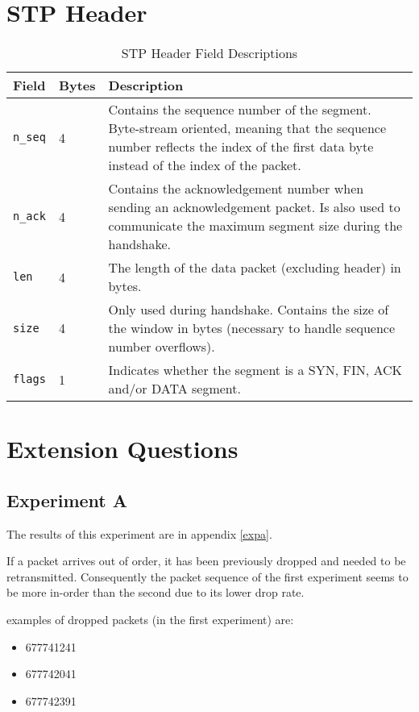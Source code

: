 \documentclass[a4paper]{article}
\begin{document}
\section{STP Header}

\begin{table}[H]
\centering
\caption{STP Header Field Descriptions}
\label{header}
\begin{tabular}{@{}llp{}@{}}
\toprule
Field & Bytes & Description \\ \midrule
\verb|n_seq| & 4 & Contains the sequence number  of the segment. Byte-stream oriented, meaning that the sequence number reflects the index of the first data byte instead of the index of the packet. \\
\verb|n_ack| & 4 & Contains the acknowledgement number when sending an acknowledgement packet. Is also used to communicate the maximum segment size during the handshake. \\
\verb|len| & 4 & The length of the data packet (excluding header) in bytes. \\
\verb|size| & 4 & Only used during handshake. Contains the size of the window in bytes (necessary to handle sequence number overflows). \\
\verb|flags| & 1 & Indicates whether the segment is a SYN, FIN, ACK and/or DATA segment. \\ \bottomrule
\end{tabular}
\end{table}

\section{Extension Questions}
\subsection{Experiment A}
The results of this experiment are in appendix \ref{expa}.

If a packet arrives out of order, it has been previously dropped and needed to be retransmitted.
Consequently the packet sequence of the first experiment seems to be more in-order than the second
due to its lower drop rate.

examples of dropped packets (in the first experiment) are:
\begin{itemize}
	\item 677741241
	\item 677742041	
	\item 677742391
\end{itemize}
\end{document}
